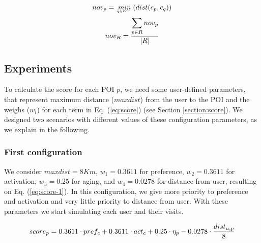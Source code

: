 \begin{itemize}
    \vspace{-0.2cm}
    \begin{equation} \label{eq:novelty}
        \footnotesize{
        nov_{p} = \  \underaccent{q \in rec}{min} \  ( dist( c_p, c_q ) )
        }
    \end{equation}
    \begin{equation} \label{eq:nov_r}
        \footnotesize{
        nov_{R} = \frac{ \displaystyle \sum_{p \in R}{nov_{p}} }{| R |}
        }
    \end{equation}
\end{itemize}

\vspace{-0.3cm}
\subsection{Experiments} \label{section:experiments}

To calculate the score for each POI $p$, we need some user-defined parameters, that represent maximum distance ($maxdist$) from the user to the POI and the weighs ($w_i$) for each term in Eq. (\ref{eq:score})   (see Section \ref{section:score}). We designed two scenarios with different values of these configuration parameters, as we explain in the following.

\vspace{-0.1cm}
\subsubsection{First configuration} 
\label{section:experiment-1}
We consider $maxdist =8 Km$, $w_1 = 0.3611$ for preference, $w_2 = 0.3611$ for activation, $w_3 = 0.25$ for aging, and $w_4 = 0.0278$ for distance from user, resulting on 
Eq. (\ref{eq:score-1}). In this configuration, we give
more priority to preference and activation and very little priority to distance from user. With these parameters we start simulating each user and their visits.

\vspace{-0.2cm}
\begin{equation} \label{eq:score-1}
     \footnotesize{   score_p =  0.3611 \cdot pref_c + 0.3611 \cdot act_c 
                                        + 0.25 \cdot \eta_p - 0.0278 \cdot \frac{dist_{u,p}}{8}
    }
\end{equation}


